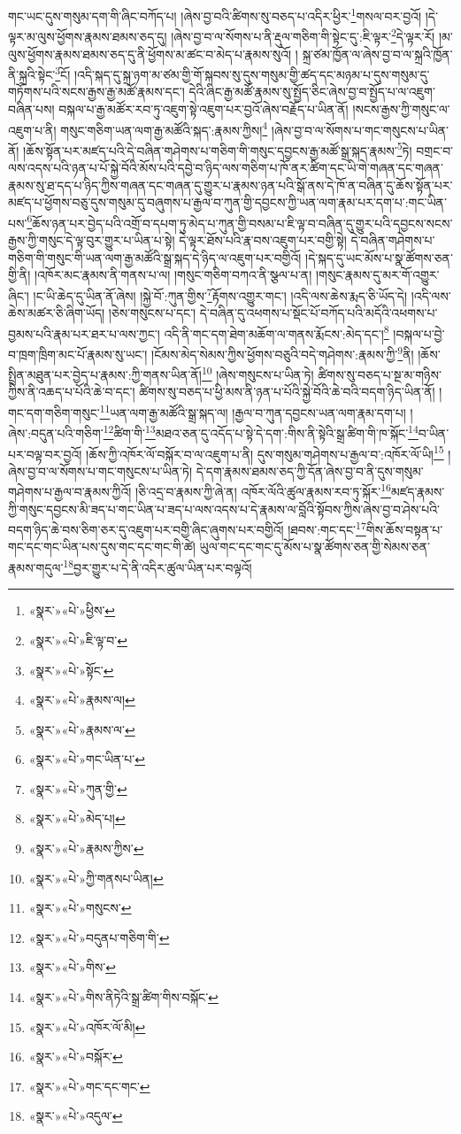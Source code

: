 གང་ཡང་དུས་གསུམ་དག་གི་ཞིང་བཀོད་པ། །ཞེས་བྱ་བའི་ཚིགས་སུ་བཅད་པ་འདིར་ཕྱིར་\footnote{«སྣར་»«པེ་»ཕྱིས་}གསལ་བར་བྱའོ། །དེ་ལྟར་མ་ལུས་ཕྱོགས་རྣམས་ཐམས་ཅད་དུ། །ཞེས་བྱ་བ་ལ་སོགས་པ་ནི་རྡུལ་གཅིག་གི་སྟེང་དུ་:ཇི་ལྟར་\footnote{«སྣར་»«པེ་»ཇི་ལྟ་བ་}དེ་ལྟར་རོ། །མ་ལུས་ཕྱོགས་རྣམས་ཐམས་ཅད་དུ་ནི་ཕྱོགས་མ་ཚང་བ་མེད་པ་རྣམས་སུའོ། །
སྐྲ་ཙམ་ཁྱོན་ལ་ཞེས་བྱ་བ་ལ་སྐྲའི་ཁྱོན་ནི་སྐྲའི་སྟེང་\footnote{«སྣར་»«པེ་»སྟོང་}ངོ། །འདི་སྐད་དུ་སྐྲ་ཉག་མ་ཙམ་གྱི་གོ་སྐབས་སུ་དུས་གསུམ་གྱི་ཚད་དང་མཉམ་པ་དུས་གསུམ་དུ་གཏོགས་པའི་སངས་རྒྱས་རྒྱ་མཚོ་རྣམས་དང་། དེའི་ཞིང་རྒྱ་མཚོ་རྣམས་སུ་སྤྱོད་ཅིང་ཞེས་བྱ་བ་སྤྱོད་པ་ལ་འཇུག་བཞིན་པས། བསྐལ་པ་རྒྱ་མཚོར་རབ་ཏུ་འཇུག་སྟེ་འཇུག་པར་བྱའོ་ཞེས་བརྗོད་པ་ཡིན་ནོ། །སངས་རྒྱས་ཀྱི་གསུང་ལ་འཇུག་པ་ནི། གསུང་གཅིག་ཡན་ལག་རྒྱ་མཚོའི་སྐད་:རྣམས་ཀྱིས།\footnote{«སྣར་»«པེ་»རྣམས་ལ།} །ཞེས་བྱ་བ་ལ་སོགས་པ་གང་གསུངས་པ་ཡིན་ནོ། །ཆོས་སྟོན་པར་མཛད་པའི་དེ་བཞིན་གཤེགས་པ་གཅིག་གི་གསུང་དབྱངས་རྒྱ་མཚོ་སྒྲ་སྐད་རྣམས་\footnote{«སྣར་»«པེ་»རྣམས་ལ་}ཏེ། བགྲང་བ་ལས་འདས་པའི་ཉན་པ་པོ་སྐྱེ་བོའི་མོས་པའི་དབྱེ་བ་ཉིད་ལས་གཅིག་པ་ཁོ་ནར་ཚིག་དང་ཡི་གེ་གཞན་དང་གཞན་རྣམས་སུ་ཐ་དད་པ་ཉིད་ཀྱིས་གཞན་དང་གཞན་དུ་གྱུར་པ་རྣམས་ཉན་པའི་སྒོ་ནས་དེ་ཁོ་ན་བཞིན་དུ་ཆོས་སྟོན་པར་མཛད་པ་ཕྱོགས་བཅུ་དུས་གསུམ་དུ་བཞུགས་པ་རྒྱལ་བ་ཀུན་གྱི་དབྱངས་ཀྱི་ཡན་ལག་རྣམ་པར་དག་པ་:གང་ཡིན་པས་\footnote{«སྣར་»«པེ་»གང་ཡིན་པ་}ཆོས་ཉན་པར་བྱེད་པའི་འགྲོ་བ་དཔག་ཏུ་མེད་པ་ཀུན་གྱི་བསམ་པ་ཇི་ལྟ་བ་བཞིན་དུ་གྱུར་པའི་དབྱངས་སངས་རྒྱས་ཀྱི་གསུང་དེ་ལྟ་བུར་གྱུར་པ་ཡིན་པ་སྟེ། དེ་ལྟར་ཐོས་པའི་རྣ་བས་འཇུག་པར་བགྱི་སྟེ། དེ་བཞིན་གཤེགས་པ་གཅིག་གི་གསུང་གི་ཡན་ལག་རྒྱ་མཚོའི་སྒྲ་སྐད་དེ་ཉིད་ལ་འཇུག་པར་བགྱིའོ། །དེ་སྐད་དུ་ཡང་མོས་པ་སྣ་ཚོགས་ཅན་གྱི་ནི། །འཁོར་མང་རྣམས་ནི་གནས་པ་ལ། །གསུང་གཅིག་བཀའ་ནི་སྩལ་པ་ན། །གསུང་རྣམས་དུ་མར་གོ་འགྱུར་ཞིང་། །ང་ཡི་ཆེད་དུ་ཡིན་ནོ་ཞེས། །སྐྱེ་བོ་:ཀུན་གྱིས་\footnote{«སྣར་»«པེ་»ཀུན་གྱི་}རྟོགས་འགྱུར་གང་། །འདི་ལས་ཆེས་རྨད་ཅི་ཡོད་དེ། །འདི་ལས་ཆེས་མཚར་ཅི་ཞིག་ཡོད། །ཅེས་གསུངས་པ་དང་། དེ་བཞིན་དུ་འཕགས་པ་སྡོང་པོ་བཀོད་པའི་མདོའི་འཕགས་པ་བྱམས་པའི་རྣམ་པར་ཐར་པ་ལས་ཀྱང་། འདི་ནི་གང་དག་ཐེག་མཆོག་ལ་གནས་རྨོངས་:མེད་དང་།\footnote{«སྣར་»«པེ་»མེད་པ།} །བསྐལ་པ་བྱེ་བ་ཁྲག་ཁྲིག་མང་པོ་རྣམས་སུ་ཡང་། །ངོམས་མེད་སེམས་ཀྱིས་ཕྱོགས་བཅུའི་བདེ་གཤེགས་:རྣམས་ཀྱི་\footnote{«སྣར་»«པེ་»རྣམས་ཀྱིས་}ནི། །ཆོས་སྤྲིན་མཐུན་པར་བྱེད་པ་རྣམས་:ཀྱི་གནས་ཡིན་ནོ།\footnote{«སྣར་»«པེ་»ཀྱི་གནསཔ་ཡིན།} །ཞེས་གསུངས་པ་ཡིན་ཏེ། ཚིགས་སུ་བཅད་པ་སྔ་མ་གཉིས་ཀྱིས་ནི་འཆད་པ་པོའི་ཆེ་བ་དང་། ཚིགས་སུ་བཅད་པ་ཕྱི་མས་ནི་ཉན་པ་པོའི་སྐྱེ་བོའི་ཆེ་བའི་བདག་ཉིད་ཡིན་ནོ། །གང་དག་གཅིག་གསུང་\footnote{«སྣར་»«པེ་»གསུངས་}ཡན་ལག་རྒྱ་མཚོའི་སྒྲ་སྐད་ལ། །རྒྱལ་བ་ཀུན་དབྱངས་ཡན་ལག་རྣམ་དག་པ། །ཞེས་:བདུན་པའི་གཅིག་\footnote{«སྣར་»«པེ་»བདུནཔ་གཅིག་གི་}ཚིག་གི་\footnote{«སྣར་»«པེ་»གིས་}མཐའ་ཅན་དུ་འདོད་པ་སྟེ་དེ་དག་:གིས་ནི་སྟེའི་སྒྲ་ཚིག་གི་ཁ་སྐོང་\footnote{«སྣར་»«པེ་»གིས་ནིཏེའི་སྒྲ་ཚིག་གིས་བསྐོང་}བ་ཡིན་པར་བལྟ་བར་བྱའོ། །ཆོས་ཀྱི་འཁོར་ལོ་བསྐོར་བ་ལ་འཇུག་པ་ནི། དུས་གསུམ་གཤེགས་པ་རྒྱལ་བ་:འཁོར་ལོ་ཡི།\footnote{«སྣར་»«པེ་»འཁོར་ལོ་མི།} །ཞེས་བྱ་བ་ལ་སོགས་པ་གང་གསུངས་པ་ཡིན་ཏེ། དེ་དག་རྣམས་ཐམས་ཅད་ཀྱི་དོན་ཞེས་བྱ་བ་ནི་དུས་གསུམ་གཤེགས་པ་རྒྱལ་བ་རྣམས་ཀྱིའོ། །ཅི་འདྲ་བ་རྣམས་ཀྱི་ཞེ་ན། འཁོར་ལོའི་ཚུལ་རྣམས་རབ་ཏུ་སྐོར་\footnote{«སྣར་»«པེ་»བསྐོར་}མཛད་རྣམས་ཀྱི་གསུང་དབྱངས་མི་ཟད་པ་གང་ཡིན་པ་ཟད་པ་ལས་འདས་པ་དེ་རྣམས་ལ་བློའི་སྟོབས་ཀྱིས་ཞེས་བྱ་བ་ཤེས་པའི་བདག་ཉིད་ཆེ་བས་ཅིག་ཅར་དུ་འཇུག་པར་བགྱི་ཞིང་ཞུགས་པར་བགྱིའོ། །ཐབས་:གང་དང་\footnote{«སྣར་»«པེ་»གང་དང་གང་}གིས་ཆོས་བསྟན་པ་གང་དང་གང་ཡིན་པས་དུས་གང་དང་གང་གི་ཚེ། ཡུལ་གང་དང་གང་དུ་མོས་པ་སྣ་ཚོགས་ཅན་གྱི་སེམས་ཅན་རྣམས་གདུལ་\footnote{«སྣར་»«པེ་»འདུལ་}བྱར་གྱུར་པ་དེ་ནི་འདིར་ཚུལ་ཡིན་པར་བལྟའོ། 